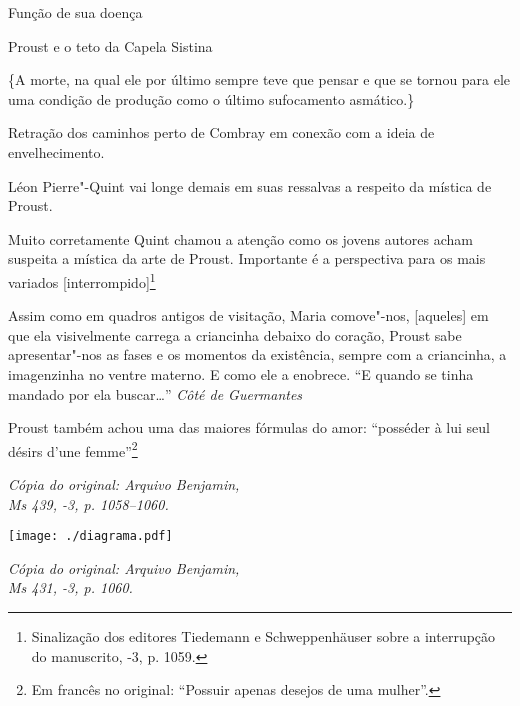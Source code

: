 \noindent{}Função de sua doença

\noindent{}Proust e o teto da Capela Sistina

\medskip

\{A morte, na qual ele por último sempre teve que pensar e que se tornou
para ele uma condição de produção como o último sufocamento asmático.\}

Retração dos caminhos perto de Combray em conexão com a ideia de
envelhecimento.

Léon Pierre"-Quint vai longe demais em suas ressalvas a respeito da
mística de Proust.

Muito corretamente Quint chamou a atenção como os jovens autores acham
suspeita a mística da arte de Proust. Importante é a perspectiva para os
mais variados {[}interrompido{]}\footnote{Sinalização dos editores
  Tiedemann e Schweppenhäuser sobre a interrupção do manuscrito,
  -3, p. 1059. \versal{[N.~T.]}}

Assim como em quadros antigos de visitação, Maria comove"-nos,
{[}aqueles{]} em que ela visivelmente carrega a criancinha debaixo do
coração, Proust sabe apresentar"-nos as fases e os momentos da
existência, sempre com a criancinha, a imagenzinha no ventre materno. E
como ele a enobrece. ``E quando se tinha mandado por ela buscar\ldots{}''
\emph{Côté de Guermantes} 

Proust também achou uma das maiores fórmulas do amor: ``posséder à lui
seul désirs d'une femme''\footnote{Em francês no original:
  ``Possuir apenas desejos de uma mulher''. \versal{[N.~T.]}}

\begin{flushright}
\emph{\footnotesize{Cópia do original: Arquivo Benjamin,\\ Ms 439, -3, p. 1058--1060.}}
\end{flushright}

\begin{flushleft}
\hspace*{-1.7cm}\texttt{[image: ./diagrama.pdf]}
\end{flushleft}

\begin{flushright}
\emph{\footnotesize{Cópia do original: Arquivo Benjamin,\\ Ms 431, -3, p. 1060.}}
\end{flushright}

